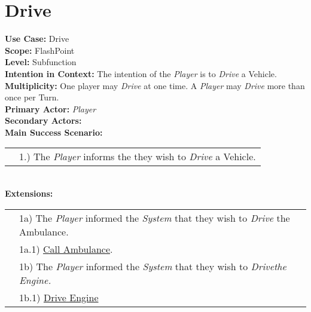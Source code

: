 \documentclass{article}
\begin{document}
	
	\section*{Drive}
	\textbf{Use Case:} Drive\\
	\textbf{Scope:} FlashPoint\\
	\textbf{Level:} Subfunction\\
	\textbf{Intention in Context:} The intention of the \textit{Player} is to \textit{Drive} a Vehicle.\\
	\textbf{Multiplicity: } One player may \textit{Drive} at one time. A \textit{Player} may \textit{Drive} more than once per Turn.\\
	\textbf{Primary Actor:} \textit{Player}\\
	\textbf{Secondary Actors:}\\
	\textbf{Main Success Scenario:}\\
	\begin{tabular}{l l}
		&1.) The \textit{Player} informs the \text{System} they wish to \textit{Drive} a Vehicle. \\
	\end{tabular}\\
	\textbf{Extensions: } \\
	\begin{tabular}{l l}
		&1a) The \textit{Player} informed the \textit{System} that they wish to \textit{Drive} the Ambulance. \\
		&\qquad1a.1) \underline{Call Ambulance}.\\
		&1b) The \textit{Player} informed the \textit{System} that they wish to \textit{Drivethe Engine.}\\
		&\qquad1b.1) \underline{Drive Engine}\\
	\end{tabular}\\
	
\end{document}
